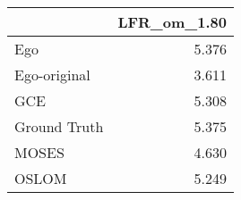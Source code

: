 \begin{tabular}{lr}
\toprule
{} & LFR_om_1.80 \\
\midrule
Ego          &       5.376 \\
Ego-original &       3.611 \\
GCE          &       5.308 \\
Ground Truth &       5.375 \\
MOSES        &       4.630 \\
OSLOM        &       5.249 \\
\bottomrule
\end{tabular}
